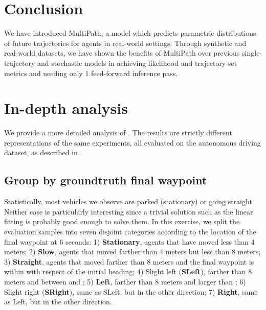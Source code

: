 \documentclass{article}
\newcommand{\multiflow}{MultiPath\xspace}
\begin{document}
\section{Conclusion}
We have introduced \multiflow, a model which predicts parametric distributions of future trajectories for agents in real-world settings.  Through synthetic and real-world datasets, we have shown the benefits of \multiflow over previous single-trajectory and stochastic models in achieving likelihood and trajectory-set metrics and needing only 1 feed-forward inference pass.
 
\small{}

\small {
  }

\newpage


\appendix


\section{In-depth analysis}
\label{sec:analysis}

We provide a more detailed analysis of . The results are strictly different representations of the same experiments, all evaluated on the autonomous driving dataset, as described in .


\subsection{Group by groundtruth final waypoint}

Statistically, most vehicles we observe are parked (stationary) or going straight. Neither case is particularly interesting since a trivial solution such as the linear fitting is probably good enough to solve them. In this exercise, we split the evaluation samples into seven disjoint categories according to the location of the final waypoint at 6 seconds: 1) \textbf{Stationary}, agents that have moved less than 4 meters; 2) \textbf{Slow}, agents that moved farther than 4 meters but less than 8 meters; 3) \textbf{Straight}, agents that moved farther than 8 meters and the final waypoint is within  with respect of the initial heading; 4) Slight left (\textbf{SLeft}), farther than 8 meters and between  and ; 5) \textbf{Left}, farther than 8 meters and larger than ; 6) Slight right (\textbf{SRight}), same as SLeft, but in the other direction; 7) \textbf{Right}, same as Left, but in the other direction.
\end{document}

